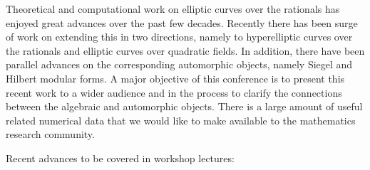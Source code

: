 \documentclass[12pt]{amsart}
\numberwithin{equation}{section}
\begin{document}
\bigskip

Theoretical and computational work on elliptic curves over the
rationals has enjoyed great advances over the past few decades.
Recently there has been surge of work on extending this in two
directions, namely to hyperelliptic curves over the rationals and
elliptic curves over quadratic fields.  In addition, there have been
parallel advances on the corresponding automorphic objects, namely
Siegel and Hilbert modular forms.  A major objective of this
conference is to present this recent work to a wider audience and in
the process to clarify the connections between the algebraic and
automorphic objects.  There is a large amount of useful related
numerical data that we would like to make available to the
mathematics research community.

Recent advances to be covered in workshop lectures:
\end{document}
